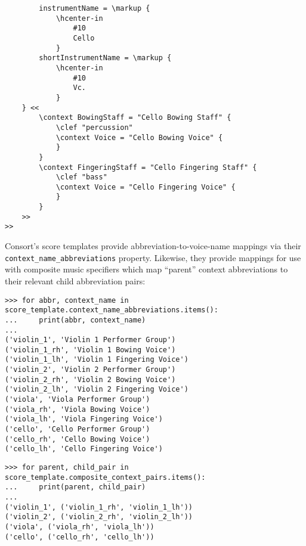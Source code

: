 \begin{abjadbookoutput}
\begin{singlespacing}
\begin{lstlisting}
        instrumentName = \markup {
            \hcenter-in
                #10
                Cello
            }
        shortInstrumentName = \markup {
            \hcenter-in
                #10
                Vc.
            }
    } <<
        \context BowingStaff = "Cello Bowing Staff" {
            \clef "percussion"
            \context Voice = "Cello Bowing Voice" {
            }
        }
        \context FingeringStaff = "Cello Fingering Staff" {
            \clef "bass"
            \context Voice = "Cello Fingering Voice" {
            }
        }
    >>
>>
\end{lstlisting}
\end{singlespacing}
\end{abjadbookoutput}

\noindent Consort's score templates provide abbreviation-to-voice-name mappings
via their \texttt{context\_name\_abbreviations} property. Likewise, they
provide mappings for use with composite music specifiers which map
\enquote{parent} context abbreviations to their relevant child abbreviation
pairs:

\begin{comment}
<abjad>
for abbr, context_name in score_template.context_name_abbreviations.items():
    print(abbr, context_name)

for parent, child_pair in score_template.composite_context_pairs.items():
    print(parent, child_pair)

</abjad>
\end{comment}

\begin{abjadbookoutput}
\begin{singlespacing}
\vspace{-0.5\baselineskip}
\begin{lstlisting}
>>> for abbr, context_name in score_template.context_name_abbreviations.items():
...     print(abbr, context_name)
...
('violin_1', 'Violin 1 Performer Group')
('violin_1_rh', 'Violin 1 Bowing Voice')
('violin_1_lh', 'Violin 1 Fingering Voice')
('violin_2', 'Violin 2 Performer Group')
('violin_2_rh', 'Violin 2 Bowing Voice')
('violin_2_lh', 'Violin 2 Fingering Voice')
('viola', 'Viola Performer Group')
('viola_rh', 'Viola Bowing Voice')
('viola_lh', 'Viola Fingering Voice')
('cello', 'Cello Performer Group')
('cello_rh', 'Cello Bowing Voice')
('cello_lh', 'Cello Fingering Voice')
\end{lstlisting}
\begin{lstlisting}
>>> for parent, child_pair in score_template.composite_context_pairs.items():
...     print(parent, child_pair)
...
('violin_1', ('violin_1_rh', 'violin_1_lh'))
('violin_2', ('violin_2_rh', 'violin_2_lh'))
('viola', ('viola_rh', 'viola_lh'))
('cello', ('cello_rh', 'cello_lh'))
\end{lstlisting}
\end{singlespacing}
\end{abjadbookoutput}


